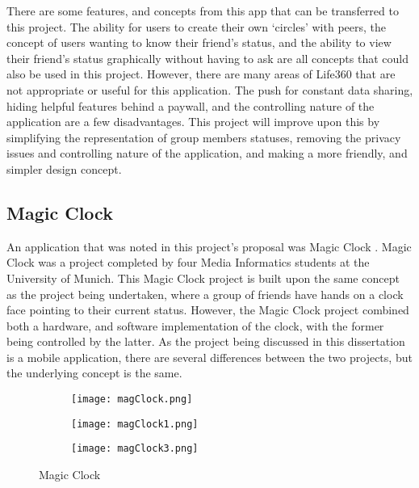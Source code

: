 There are some features, and concepts from this app that can be transferred to this project. The ability for users to create their own `circles' with peers, the concept of users wanting to know their friend's status, and the ability to view their friend's status graphically without having to ask are all concepts that could also be used in this project. However, there are many areas of Life360 that are not appropriate or useful for this application. The push for constant data sharing, hiding helpful features behind a paywall, and the controlling nature of the application are a few disadvantages. This project will improve upon this by simplifying the representation of group members statuses, removing the privacy issues and controlling nature of the application, and making a more friendly, and simpler design concept. 

\subsection{Magic Clock}

An application that was noted in this project's proposal was Magic Clock \cite{magicClock}. Magic Clock was a project completed by four Media Informatics students at the University of Munich. This Magic Clock project is built upon the same concept as the project being undertaken, where a group of friends have hands on a clock face pointing to their current status. However, the Magic Clock project combined both a hardware, and software implementation of the clock, with the former being controlled by the latter. As the project being discussed in this dissertation is a mobile application, there are several differences between the two projects, but the underlying concept is the same. 

\begin{figure}[!htbp]
    \centering
    \begin{subfigure}[b]{0.22\textwidth}
        \texttt{[image: magClock.png]}
    \end{subfigure}
    \hspace{1.5em}
    \begin{subfigure}[b]{0.22\textwidth}
        \texttt{[image: magClock1.png]}
    \end{subfigure}
    \hspace{1.5em}
    \begin{subfigure}[b]{0.22\textwidth}
        \texttt{[image: magClock3.png]}
    \end{subfigure}
    \caption{Magic Clock}
    \label{fig:magClock}
\end{figure}
\FloatBarrier

